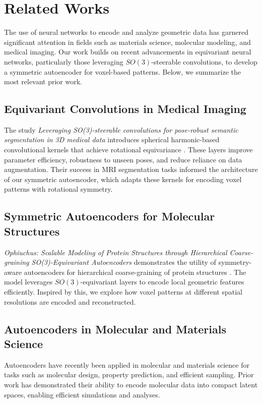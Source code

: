 \documentclass[letterpaper]{article}
\begin{document}
\section{Related Works}

The use of neural networks to encode and analyze geometric data has garnered significant attention in fields such as materials science, molecular modeling, and medical imaging. Our work builds on recent advancements in equivariant neural networks, particularly those leveraging $SO(3)$-steerable convolutions, to develop a symmetric autoencoder for voxel-based patterns. Below, we summarize the most relevant prior work.

\subsection{Equivariant Convolutions in Medical Imaging}
The study \emph{Leveraging SO(3)-steerable convolutions for pose-robust semantic segmentation in 3D medical data} introduces spherical harmonic-based convolutional kernels that achieve rotational equivariance \cite{e3nn_medical}. These layers improve parameter efficiency, robustness to unseen poses, and reduce reliance on data augmentation. Their success in MRI segmentation tasks informed the architecture of our symmetric autoencoder, which adapts these kernels for encoding voxel patterns with rotational symmetry.

\subsection{Symmetric Autoencoders for Molecular Structures}
\emph{Ophiuchus: Scalable Modeling of Protein Structures through Hierarchical Coarse-graining SO(3)-Equivariant Autoencoders} demonstrates the utility of symmetry-aware autoencoders for hierarchical coarse-graining of protein structures \cite{ophiuchus}. The model leverages $SO(3)$-equivariant layers to encode local geometric features efficiently. Inspired by this, we explore how voxel patterns at different spatial resolutions are encoded and reconstructed.

\subsection{Autoencoders in Molecular and Materials Science}
Autoencoders have recently been applied in molecular and materials science for tasks such as molecular design, property prediction, and efficient sampling. Prior work\cite{nature_materials, chem_comm, arxiv_2022} has demonstrated their ability to encode molecular data into compact latent spaces, enabling efficient simulations and analyses. 
\end{document}
